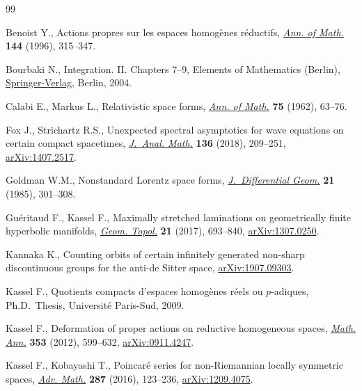 \documentclass[pdftex]{sigma}
\numberwithin{equation}{section}
\begin{document}
\begin{thebibliography}{99}
\footnotesize\itemsep=0pt

Benoist Y., Actions propres sur les espaces homog\`enes r\'eductifs,
 \href{https://doi.org/10.2307/2118594}{\textit{Ann. of Math.}} \textbf{144} (1996), 315--347.

Bourbaki N., Integration. {II}. {C}hapters 7--9, Elements of Mathematics
 (Berlin), \href{https://doi.org/10.1007/978-3-662-07931-7}{Springer-Verlag}, Berlin, 2004.

Calabi E., Markus L., Relativistic space forms, \href{https://doi.org/10.2307/1970419}{\textit{Ann. of Math.}}
 \textbf{75} (1962), 63--76.

Fox J., Strichartz R.S., Unexpected spectral asymptotics for wave equations on
 certain compact spacetimes, \href{https://doi.org/10.1007/s11854-018-0059-2}{\textit{J.~Anal. Math.}} \textbf{136} (2018),
 209--251, \href{https://arxiv.org/abs/1407.2517}{arXiv:1407.2517}.

Goldman W.M., Nonstandard {L}orentz space forms, \href{https://doi.org/10.4310/jdg/1214439567}{\textit{J.~Differential Geom.}}
 \textbf{21} (1985), 301--308.

Gu\'eritaud F., Kassel F., Maximally stretched laminations on geometrically
 finite hyperbolic manifolds, \href{https://doi.org/10.2140/gt.2017.21.693}{\textit{Geom. Topol.}} \textbf{21} (2017),
 693--840, \href{https://arxiv.org/abs/1307.0250}{arXiv:1307.0250}.

Kannaka K., Counting orbits of certain infinitely generated non-sharp
 discontinuous groups for the anti-de {S}itter space, \href{https://arxiv.org/abs/1907.09303}{arXiv:1907.09303}.

Kassel F., Quotients compacts d'espaces homog\`enes r\'eels ou $p$-adiques,
 Ph.D.~Thesis, {U}niversit\'e Paris-Sud, 2009.

Kassel F., Deformation of proper actions on reductive homogeneous spaces,
 \href{https://doi.org/10.1007/s00208-011-0672-1}{\textit{Math. Ann.}} \textbf{353} (2012), 599--632, \href{https://arxiv.org/abs/0911.4247}{arXiv:0911.4247}.

Kassel F., Kobayashi T., Poincar\'e series for non-{R}iemannian locally
 symmetric spaces, \href{https://doi.org/10.1016/j.aim.2015.08.029}{\textit{Adv. Math.}} \textbf{287} (2016), 123--236,
 \href{https://arxiv.org/abs/1209.4075}{arXiv:1209.4075}.


\end{thebibliography}
\end{document}
